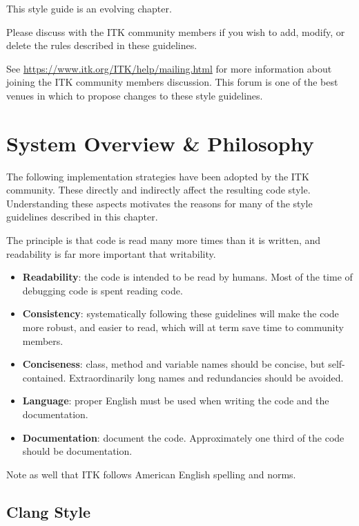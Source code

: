 This style guide is an evolving chapter.

Please discuss with the ITK community members if you wish to add, modify, or
delete the rules described in these guidelines.

See \href{https://www.itk.org/ITK/help/mailing.html}{https://www.itk.org/ITK/help/mailing.html}
for more information about joining the ITK community members discussion. This
forum is one of the best venues in which to propose changes to these style
guidelines.


\section{System Overview \& Philosophy}%
\label{sec:SystemOverviewPhilosophy}

The following implementation strategies have been adopted by the ITK community.
These directly and indirectly affect the resulting code style. Understanding
these aspects motivates the reasons for many of the style guidelines described
in this chapter.

The principle is that code is read many more times than it is written, and
readability is far more important that writability.

\begin{itemize}
\item \textbf{Readability}: the code is intended to be read by humans. Most of
the time of debugging code is spent reading code.
\item \textbf{Consistency}: systematically following these guidelines will make
the code more robust, and easier to read, which will at term save time to
community members.
\item \textbf{Conciseness}: class, method and variable names should be concise,
but self-contained. Extraordinarily long names and redundancies should be
avoided.
\item \textbf{Language}: proper English must be used when writing the code and
the documentation.
\item \textbf{Documentation}: document the code. Approximately one third of the
code should be documentation.
\end{itemize}

Note as well that ITK follows American English spelling and norms.


\subsection{Clang Style}%
\label{subsec:clangStyle}

